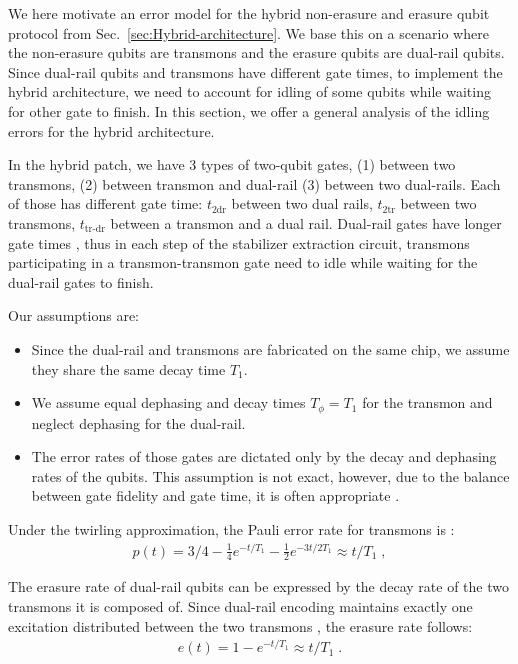 \documentclass[twocolumn,
notitlepage,
aps,
prx,
floatfix,
superscriptaddress
]{revtex4-2}
\begin{document}
We here motivate an error model for the hybrid non-erasure and erasure qubit protocol from Sec.~\ref{sec:Hybrid-architecture}. We base this on a scenario where the non-erasure qubits are transmons and the erasure qubits are dual-rail qubits.
Since dual-rail qubits and transmons have different gate times, to implement the hybrid architecture, we need to account for idling of some qubits while waiting for other gate to finish. In this section, we offer a general analysis of the idling errors for the hybrid architecture.

In the hybrid patch, we have 3 types of two-qubit gates, (1) between two transmons, (2) between transmon and dual-rail (3) between two dual-rails. Each of those has different gate time: $t_\text{2dr}$ between two dual rails, 
$t_\text{2tr}$ between two transmons, $t_\text{tr-dr}$ between a transmon and a dual rail. Dual-rail gates have longer gate times \cite{Kubica_2023}, thus in each step of the stabilizer extraction circuit, transmons participating in a transmon-transmon gate need to idle while waiting for the dual-rail gates to finish.

Our assumptions are:
\begin{itemize}
    \item Since the dual-rail and transmons are fabricated on the same chip, we assume they share the same decay time $T_1$.
    \item We assume equal dephasing and decay times $T_\phi=T_1$ for the transmon and neglect dephasing for the dual-rail.
    \item The error rates of those gates are dictated only by the decay and dephasing rates of the qubits. This assumption is not exact, however, due to the balance between gate fidelity and gate time, it is often appropriate \cite{Motzoi_2009}.
\end{itemize}

Under the twirling approximation, the Pauli error rate for transmons is \cite{Ghosh_2012}:
\begin{align}
    p(t) = 3/4 - \frac{1}{4}e^{-t/T_1} - \frac{1}{2}e^{-3t/2T_1} \approx t/T_1 \;,
\end{align}

The erasure rate of dual-rail qubits can be expressed by 
the decay rate of the two transmons it is composed of.
Since dual-rail encoding maintains exactly one excitation distributed between the two transmons \cite{Kubica_2023}, the erasure rate follows:
\begin{align}
    e(t)
     = 1 - e^{-t/T_1} \approx t/T_1 \;.
\end{align}
\end{document}
